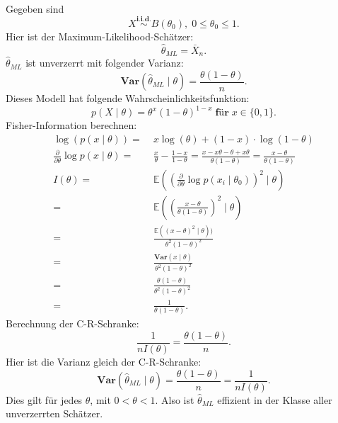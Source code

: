\documentclass[10pt]{article}
\newcommand{\EW}{\mathbb{E}} %
\newcommand{\ablt}{\frac{\partial}{\partial \theta}}
\newcommand{\Var}{\textbf{Var}} %
\newenvironment{BSP}[1][]
{\begin{Beispiel}[frametitle=#1]}{\end{Beispiel}}
\begin{document}
	\begin{BSP}[Beispiel 1.4.2 (Anwendung C-R-Schranke Bernoulli-Verteilung)]
		Gegeben sind
		\begin{equation*}
			X \overset{\textbf{i.i.d.}}{\sim} B(\theta_0), \; 0 \leq \theta_0 \leq 1.
		\end{equation*}
		Hier ist der Maximum-Likelihood-Schätzer:
		\begin{equation*}
			\hat{\theta}_{ML} = \bar{X}_n.
		\end{equation*}
		$\hat{\theta}_{ML}$ ist unverzerrt mit folgender Varianz:
		\begin{equation*}
			\textbf{Var}(\hat{\theta}_{ML} \mid \theta) = \frac{\theta (1-\theta)}{n}.
		\end{equation*}
		Dieses Modell hat folgende Wahrscheinlichkeitsfunktion:
		\begin{equation*}
			p (X \mid \theta) = \theta^x(1-\theta)^{1-x} \; \textbf{für} \; x \in \{0,1\}.
		\end{equation*}
		Fisher-Information berechnen:
		\begin{equation*}
			\begin{split}
				\log(p(x \mid \theta)) =& \; x \log (\theta) +(1-x) \cdot \log(1-\theta)\\
				\ablt \log p(x \mid \theta) =& \; \frac{x}{\theta} - \frac{1-x}{1-\theta} = \frac{x-x\theta-\theta+x\theta}{\theta (1-\theta)} = \frac{x-\theta}{\theta (1-\theta)}\\
				I(\theta) =& \; \EW \left(\left(\ablt \log p(x_i \mid \theta_0)\right)^2 \mid \theta\right)\\
				=& \; \EW \left(\left(\frac{x-\theta}{\theta(1-\theta)}\right)^2 \mid \theta \right)\\
				=& \; \frac{\EW ( (x-\theta)^2 \mid \theta))}{\theta^2 (1-\theta)^2}\\
				=& \; \frac{\textbf{Var}(x\mid \theta)}{\theta^2 (1-\theta)^2}\\ 
				=& \; \frac{\theta(1-\theta)}{\theta^2 (1-\theta)^2}\\
				=& \; \frac{1}{\theta(1-\theta)}.
			\end{split}
		\end{equation*}
		Berechnung der C-R-Schranke:
		\begin{equation*}
			\frac{1}{nI(\theta)} = \frac{\theta(1-\theta)}{n}.
		\end{equation*}
		Hier ist die Varianz gleich der C-R-Schranke:
		\begin{equation*}
			\Var(\hat{\theta}_{ML} \mid \theta) = \frac{\theta(1-\theta)}{n} = \frac{1}{nI(\theta)}.
		\end{equation*}
		Dies gilt für jedes $\theta$, mit $0< \theta <1$. 
		Also ist $\hat{\theta}_{ML}$ effizient in der Klasse aller unverzerrten Schätzer. 
	\end{BSP}
	
\end{document}
